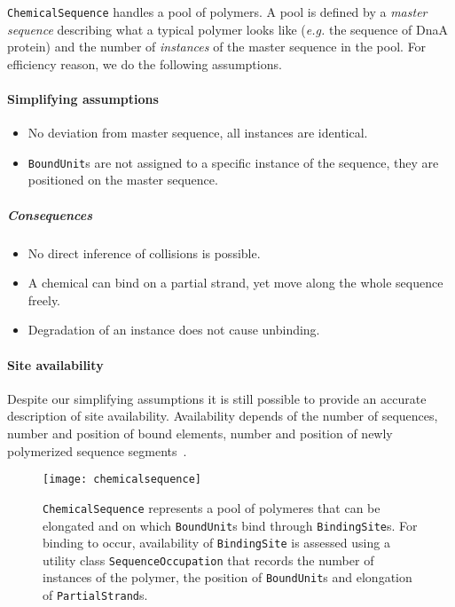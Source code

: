 \texttt{ChemicalSequence} handles a pool of polymers. A pool is defined by a \emph{master sequence} describing what a typical polymer looks like (\textit{e.g.} the sequence of DnaA protein) and the number of \emph{instances} of the master sequence in the pool. For efficiency reason, we do the following assumptions.

\paragraph{Simplifying assumptions}
\begin{itemize}
\item No deviation from master sequence, all instances are identical.
\item \texttt{BoundUnit}s are not assigned to a specific instance of the sequence, they are positioned on the  master sequence.
\end{itemize}

\subparagraph{Consequences}
\begin{itemize}
\item No direct inference of collisions is possible.
\item A chemical can bind on a partial strand, yet move along the whole sequence freely.
\item Degradation of an instance does not cause unbinding.
\end{itemize}

\paragraph{Site availability}
Despite our simplifying assumptions it is still possible to provide an accurate description of site availability. Availability depends of the number of sequences, number and position of bound elements, number and position of newly polymerized sequence segments~.

\begin{figure}[!h]
  \centering
  \texttt{[image: chemicalsequence]}
  \caption{\texttt{ChemicalSequence} represents a pool of polymeres that can be elongated and on which \texttt{BoundUnit}s bind through \texttt{BindingSite}s. For binding to occur, availability of \texttt{BindingSite} is assessed using a utility class \texttt{SequenceOccupation} that records the number of instances of the polymer, the position of \texttt{BoundUnit}s and elongation of \texttt{PartialStrand}s.}
  \label{fig:chemical_sequence}
\end{figure}

